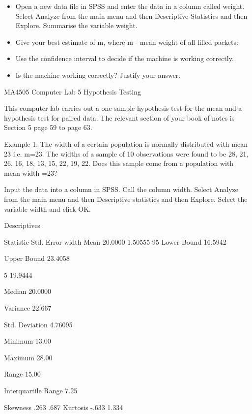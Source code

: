 \begin{itemize}
\item 
Open a new data file in SPSS and enter the data in a column called weight. Select Analyze from the main menu and then Descriptive Statistics and then Explore. Summarise the variable weight.
\item  
Give your best estimate of m, where m - mean weight of all filled packets:
\item  
Use the confidence interval to decide if the machine is working correctly.
\item  
Is the machine working correctly? Justify your answer.
\end{itemize}
 
 
 
MA4505  Computer Lab 5  Hypothesis Testing
 
 
This computer lab carries out a one sample hypothesis test for the mean and a hypothesis test for paired data. The relevant section of your book of notes is Section 5 page 59 to page 63.
 
Example 1:
The width of a certain population is normally distributed with mean 23 i.e. m=23. The widths of a sample of 10 observations were found to be 28, 21, 26, 16, 18, 13, 15, 22, 19, 22. Does this sample come from a population with mean width =23?
 
Input the data into a column in SPSS. Call the column width. Select Analyze from the main menu and then Descriptive statistics and then Explore. Select the variable width and click OK.
 
 
Descriptives
 	 	 	
Statistic
Std. Error
width
Mean
20.0000
1.50555
95%
Lower Bound
16.5942
 
Upper Bound
23.4058
 
5%
19.9444
 
Median
20.0000
 
Variance
22.667
 
Std. Deviation
4.76095
 
Minimum
13.00
 
Maximum
28.00
 
Range
15.00
 
Interquartile Range
7.25
 
Skewness
.263
.687
Kurtosis
-.633
1.334
 
 
 
 
 
